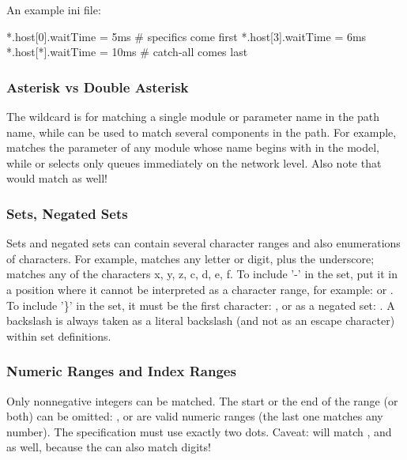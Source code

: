 An example ini file:

\begin{inifile}
[General]
*.host[0].waitTime = 5ms   # specifics come first
*.host[3].waitTime = 6ms
*.host[*].waitTime = 10ms  # catch-all comes last
\end{inifile}


\subsubsection{Asterisk vs Double Asterisk}
\label{sec:config-sim:asterisk-vs-double-asterisk}

The \ttt{*} wildcard is for matching a single module or parameter name in the
path name, while \ttt{**} can be used to match several components in the path.
For example,  matches the  parameter of any module
whose name begins with  in the model, while 
or  selects only queues immediately on the network level.
Also note that  would match 
as well!

\subsubsection{Sets, Negated Sets}
\label{sec:config-sim:sets-negated-sets}

Sets and negated sets can contain several character ranges and also
enumerations of characters. For example,  matches any letter
or digit, plus the underscore;  matches any of the characters
x, y, z, c, d, e, f.
To include '-' in the set, put it in a position where it cannot be
interpreted as a character range, for example:  or .
To include '\}' in the set, it must be the first character: ,
or as a negated set: .
A backslash is always taken as a literal backslash (and not as an escape
character) within set definitions.


\subsubsection{Numeric Ranges and Index Ranges}
\label{sec:config-sim:numeric-ranges-and-index-ranges}

Only nonnegative integers can be matched.  The start or the end of the range
(or both) can be omitted: ,  or 
are valid numeric ranges (the last one matches any number).
The specification must use exactly two dots.
Caveat:  will match ,  and  as well,
because the \ttt{*} can also match digits!

